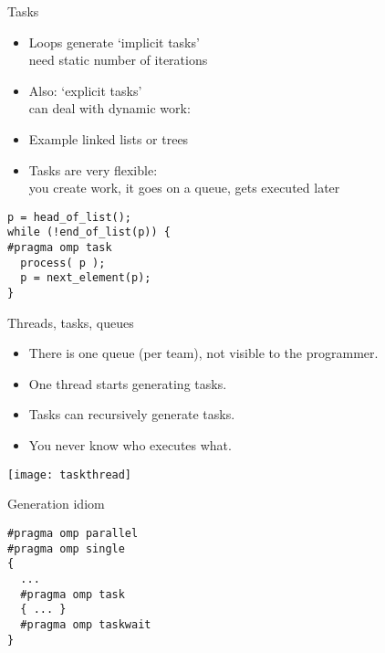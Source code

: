 
\begin{numberedframe}{Tasks}
  \begin{itemize}
  \item Loops generate `implicit tasks'\\
    need static number of iterations
  \item Also: `explicit tasks' \\
    can deal with dynamic work:
  \item 
    Example linked lists or trees
  \item Tasks are very flexible:\\
    you create work, it goes on a queue, gets executed later
  \end{itemize}
\begin{verbatim}
p = head_of_list();
while (!end_of_list(p)) {
#pragma omp task
  process( p );
  p = next_element(p);
}
\end{verbatim}
\end{numberedframe}

\begin{numberedframe}{Threads, tasks, queues}
  \begin{itemize}
  \item There is one queue (per team), not visible to the programmer.
  \item One thread starts generating tasks.
  \item Tasks can recursively generate tasks.
  \item You never know who executes what.
  \end{itemize}
  \texttt{[image: taskthread]}
\end{numberedframe}

\begin{numberedframe}{Generation idiom}
\begin{lstlisting}
#pragma omp parallel
#pragma omp single
{
  ...
  #pragma omp task
  { ... }
  #pragma omp taskwait
}
\end{lstlisting}
\end{numberedframe}


